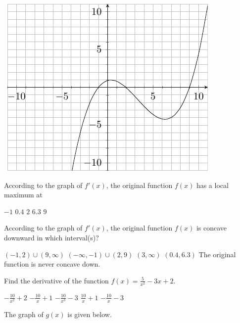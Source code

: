 \documentclass[11pt]{article}
\begin{document}
\begin{questions}
\begin{multiplechoice}{5}
\begin{questions}
\begin{multiplechoice}{5}
\begin{minipage}{\linewidth}%
\centering
\makebox[\linewidth]{}
\includegraphics{exam2graph1.pdf}
\label{graph1exam1}%
\end{minipage}


\begin{questions}
\begin{multiplechoice}{5}

\question According to the graph of $f'(x)$, the original function $f(x)$ has a local maximum at
\begin{answers}{3}
\ans $-1$
\ans $0.4$
\ans $2$
\ans $6.3$
\ans $9$
\end{answers}


\question According to the graph of $f'(x)$, the original function $f(x)$ is concave downward in which interval(s)?
\begin{answers}{3}
\ans $(-1,2) \cup (9, \infty)$
\ans $(-\infty, -1) \cup (2,9)$
\ans $(3, \infty)$
\ans $(0.4,6.3)$
\ans The original function is never concave down.
\end{answers}


\question Find the derivative of the function $f(x) = \frac{5}{x^2} - 3x + 2$.
\begin{answers}{2}
\ans $-\frac{10}{x^2} + 2$
\ans $-\frac{10}{x} + 1$
\ans $-\frac{10}{x^3} -3$
\ans $\frac{10}{x} +1$
\ans $-\frac{10}{x} - 3$
\end{answers}

\newpage

The graph of $g(x)$ is given below.\\


\end{multiplechoice}
\end{questions}
\end{multiplechoice}
\end{questions}
\end{multiplechoice}
\end{questions}
\end{document}
